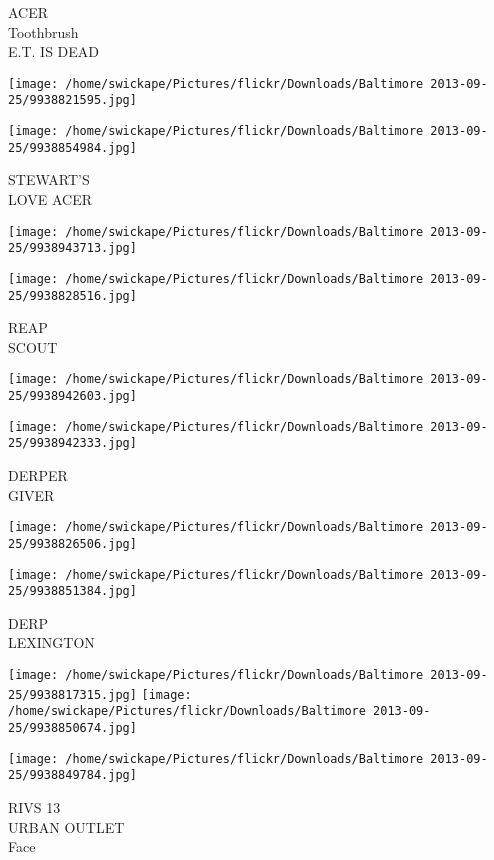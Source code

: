 \documentclass[10pt,letterpaper]{article}
\begin{document}
ACER\\
Toothbrush\\
E.T. IS DEAD
\pagebreak

\texttt{[image: /home/swickape/Pictures/flickr/Downloads/Baltimore 2013-09-25/9938821595.jpg]}

\vspace{0.25in}
\texttt{[image: /home/swickape/Pictures/flickr/Downloads/Baltimore 2013-09-25/9938854984.jpg]}

STEWART'S\\
LOVE ACER
\pagebreak

\texttt{[image: /home/swickape/Pictures/flickr/Downloads/Baltimore 2013-09-25/9938943713.jpg]}

\vspace{0.25in}
\texttt{[image: /home/swickape/Pictures/flickr/Downloads/Baltimore 2013-09-25/9938828516.jpg]}

REAP\\
SCOUT
\pagebreak

\texttt{[image: /home/swickape/Pictures/flickr/Downloads/Baltimore 2013-09-25/9938942603.jpg]}

\vspace{0.25in}
\texttt{[image: /home/swickape/Pictures/flickr/Downloads/Baltimore 2013-09-25/9938942333.jpg]}

DERPER\\
GIVER
\pagebreak

\texttt{[image: /home/swickape/Pictures/flickr/Downloads/Baltimore 2013-09-25/9938826506.jpg]}

\vspace{0.25in}
\texttt{[image: /home/swickape/Pictures/flickr/Downloads/Baltimore 2013-09-25/9938851384.jpg]}

DERP\\
LEXINGTON
\pagebreak

\texttt{[image: /home/swickape/Pictures/flickr/Downloads/Baltimore 2013-09-25/9938817315.jpg]}
\texttt{[image: /home/swickape/Pictures/flickr/Downloads/Baltimore 2013-09-25/9938850674.jpg]}

\vspace{0.25in}
\texttt{[image: /home/swickape/Pictures/flickr/Downloads/Baltimore 2013-09-25/9938849784.jpg]}

RIVS 13\\
URBAN OUTLET\\
Face
\pagebreak
\end{document}
